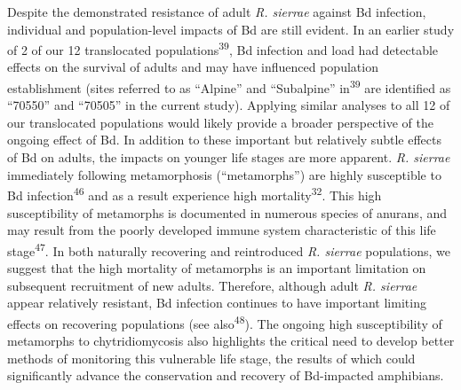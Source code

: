 \documentclass[
  letterpaper,
  DIV=11,
  numbers=noendperiod]{scrartcl}
\begin{document}
Despite the demonstrated resistance of adult \emph{R. sierrae} against
Bd infection, individual and population-level impacts of Bd are still
evident. In an earlier study of 2 of our 12 translocated
populations\textsuperscript{39}, Bd infection and load had detectable
effects on the survival of adults and may have influenced population
establishment (sites referred to as ``Alpine'' and ``Subalpine''
in\textsuperscript{39} are identified as ``70550'' and ``70505'' in the
current study). Applying similar analyses to all 12 of our translocated
populations would likely provide a broader perspective of the ongoing
effect of Bd. In addition to these important but relatively subtle
effects of Bd on adults, the impacts on younger life stages are more
apparent. \emph{R. sierrae} immediately following metamorphosis
(``metamorphs'') are highly susceptible to Bd
infection\textsuperscript{46} and as a result experience high
mortality\textsuperscript{32}. This high susceptibility of metamorphs is
documented in numerous species of anurans, and may result from the
poorly developed immune system characteristic of this life
stage\textsuperscript{47}. In both naturally recovering and reintroduced
\emph{R. sierrae} populations, we suggest that the high mortality of
metamorphs is an important limitation on subsequent recruitment of new
adults. Therefore, although adult \emph{R. sierrae} appear relatively
resistant, Bd infection continues to have important limiting effects on
recovering populations (see also\textsuperscript{48}). The ongoing high
susceptibility of metamorphs to chytridiomycosis also highlights the
critical need to develop better methods of monitoring this vulnerable
life stage, the results of which could significantly advance the
conservation and recovery of Bd-impacted amphibians.
\end{document}
